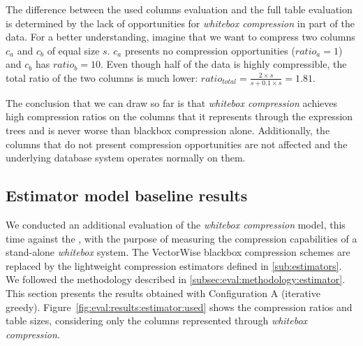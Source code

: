 The difference between the used columns evaluation and the full table evaluation is determined by the lack of opportunities for \textit{whitebox compression} in part of the data. For a better understanding, imagine that we want to compress two columns \(c_{a}\) and \(c_{b}\) of equal size \(s\). \(c_{a}\) presents no compression opportunities (\(ratio_{a} = 1\)) and \(c_{b}\) has \(ratio_{b} = 10\). Even though half of the data is highly compressible, the total ratio of the two columns is much lower: \(ratio_{total} = \frac{2 \times s}{s + 0.1 \times s} = 1.81\).

The conclusion that we can draw so far is that \textit{whitebox compression} achieves high compression ratios on the columns that it represents through the expression trees and is never worse than blackbox compression alone. Additionally, the columns that do not present compression opportunities are not affected and the underlying database system operates normally on them.



\subsection{Estimator model baseline results}
\label{subsec:eval:results:estimator}

We conducted an additional evaluation of the \textit{whitebox compression} model, this time against the , with the purpose of measuring the compression capabilities of a stand-alone \textit{whitebox} system. The VectorWise blackbox compression schemes are replaced by the lightweight compression estimators defined in \ref{sub:estimators}. We followed the methodology described in \ref{subsec:eval:methodology:estimator}. This section presents the results obtained with Configuration A (iterative greedy). Figure~\ref{fig:eval:results:estimator:used} shows the compression ratios and table sizes, considering only the columns represented through \textit{whitebox compression}.

